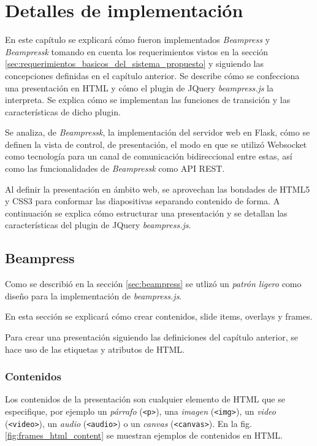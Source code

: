 \chapter{Detalles de implementación} %
\label{cha:detalles_de_implementacion}
	En este capítulo se explicará cómo fueron implementados \textit{Beampress} y \textit{Beampressk} tomando en cuenta los requerimientos vistos en la sección \ref{sec:requerimientos_basicos_del_sistema_propuesto} y siguiendo las concepciones definidas en el capítulo anterior. Se describe cómo se confecciona una presentación en HTML y cómo el plugin de JQuery \textit{beampress.js} la interpreta. Se explica cómo se implementan las funciones de transición y las características de dicho plugin.

	Se analiza, de \textit{Beampressk}, la implementación del servidor web en Flask, cómo se definen la vista de control, de presentación, el modo en que se utilizó Websocket como tecnología para un canal de comunicación bidireccional entre estas, así como las funcionalidades de \textit{Beampressk} como API REST.

	Al definir la presentación en ámbito web, se aprovechan las bondades de HTML5 y CSS3 para conformar las diapositivas separando contenido de forma. A continuación se explica cómo estructurar una presentación y se detallan las características del plugin de JQuery \textit{beampress.js}. 

	\section{Beampress} %
	\label{sec:beampress_imp}
	

		Como se describió en la sección \ref{sec:beampress} se utlizó un  \textit{patrón ligero} como diseño para la implementación de \textit{beampress.js}. 

		En esta sección se explicará cómo crear contenidos, slide items, overlays y frames.

		Para crear una presentación siguiendo las definiciones del capítulo anterior, se hace uso de las etiquetas y atributos de HTML.


		\subsection{Contenidos} %
		\label{sub:contenidos}
			Los contenidos de la presentación son cualquier elemento de HTML que se especifique, por ejemplo un \textit{párrafo} (\texttt{<p>}), una \textit{imagen} (\texttt{<img>}), un \textit{video} (\texttt{<video>}), un \textit{audio} (\texttt{<audio>}) o un \textit{canvas} (\texttt{<canvas>}). En la fig. \ref{fig:frames_html_content} se muestran ejemplos de contenidos en HTML.

